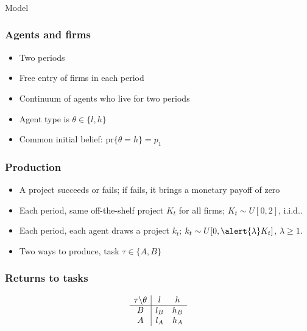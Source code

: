 \documentclass[slides,english,compress]{beamer}
\begin{document}
\begin{frame}
	\frametitle{}
	\begin{center}%
		\Huge Model 
	\end{center}
\end{frame}
\begin{frame}
	\frametitle{Agents and firms}
	\begin{itemize}
		\item Two periods
		\item Free entry of firms in each period
		\item Continuum of agents who live for two periods
		\item Agent type is $\theta\in\{l,h\}$
		\item Common initial belief: $\mbox{pr}\{\theta=h\}=p_1$
	\end{itemize}
\end{frame}
\begin{frame}
	\frametitle{Production}
	\begin{itemize}
		\item A project succeeds or fails; if fails, it brings a monetary payoff of zero
		\item Each period, same off-the-shelf project $K_t$ for \alert{all firms}; \alert{$K_t\sim U[0,2]$}, i.i.d..
		\item Each period, \alert{each agent} draws a project $k_t$; \alert{$k_t\sim U[0, \alert{\lambda}K_t]$}, $\lambda\geq 1$. 
		\item Two ways to produce, \alert{task} $\tau\in\{A,B\}$ 
	\end{itemize}

\end{frame}
\begin{frame}
	\frametitle{Returns to tasks}
		\[  
  \begin{array}{  c |c  c }
  \tau\backslash\theta & l & h \\
  \hline
 B & l_B & h_B \\
A & l_A & h_A 
\end{array}
\]
\end{frame}
\end{document}
